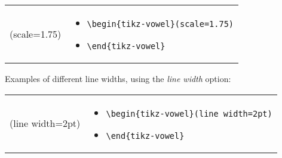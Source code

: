 \documentclass{article}
\def\\{}%
\begin{document}
\begin{center}
\begin{tabular}{rl}
  \begin{minipage}[t]{0.45\textwidth}
  \centering
	\begin{tikz-vowel}(scale=1.75)
	\end{tikz-vowel}
  \end{minipage} &
  \begin{minipage}[t]{0.2\textwidth}
  \vspace{-100pt}
  {\small
\begin{itemize}[label={}]
	\item \verb|\begin{tikz-vowel}(scale=1.75)|
	\item \verb|\end{tikz-vowel}|
\end{itemize}
    }
  \end{minipage}\\
\end{tabular}
\end{center}

\bigskip
\noindent
Examples of different line widths, using the \textit{line width} option:

\begin{center}
\begin{tabular}{rl}
  \begin{minipage}[t]{0.45\textwidth}
  \centering
	\begin{tikz-vowel}(line width=2pt)
	\end{tikz-vowel}
  \end{minipage} &
  \begin{minipage}[t]{0.2\textwidth}
  \vspace{-65pt}
  {\small
\begin{itemize}[label={}]
	\item \verb|\begin{tikz-vowel}(line width=2pt)|
	\item \verb|\end{tikz-vowel}|
\end{itemize}
    }
  \end{minipage}\\
\end{tabular}
\end{center}
\end{document}
